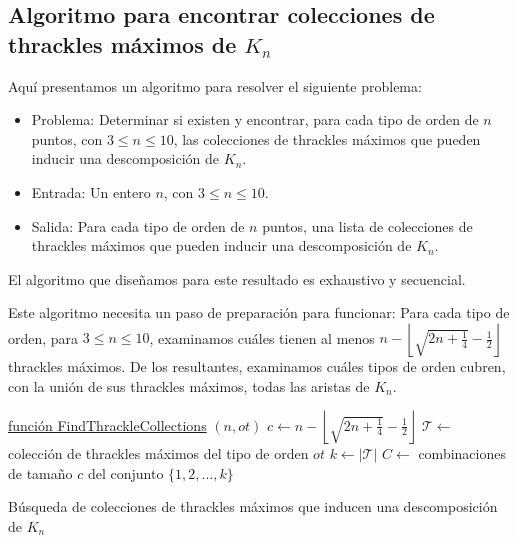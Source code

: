 \subsection{Algoritmo para encontrar colecciones de thrackles máximos de $K_n$} \label{secc:algo_descomposicion_thrackles_maximos}
  Aquí presentamos un algoritmo para resolver el siguiente problema:
  \begin{itemize}
    \item[] Problema: Determinar si existen y encontrar, para cada tipo de orden de $n$ puntos, con $3 \leq n \leq 10$, las colecciones de thrackles máximos que pueden inducir una descomposición de $K_n$.
    \item[] Entrada: Un entero $n$, con $ 3 \leq n \leq 10$.
    \item[] Salida: Para cada tipo de orden de $n$ puntos, una lista de colecciones de thrackles máximos que pueden inducir una descomposición de $K_n$.
  \end{itemize}

  El algoritmo que diseñamos para este resultado es exhaustivo y secuencial.

  Este algoritmo necesita un paso de preparación para funcionar: Para cada tipo de orden,
  para $3\leq n \leq 10$, examinamos cuáles tienen al menos $n - \left\lfloor\sqrt{2n +
  \frac{1}{4}} - \frac{1}{2}\right\rfloor$ thrackles máximos. De los resultantes,
  examinamos cuáles tipos de orden cubren, con la unión de sus thrackles máximos, todas
  las aristas de $K_n$.

  \begin{algorithm}[H]
    \DontPrintSemicolon
    \underline{función FindThrackleCollections} $(n,ot)$\;
    $c \gets n - \left\lfloor\sqrt{2n + \frac{1}{4}} - \frac{1}{2}\right\rfloor$\;
    $\mathcal{T} \gets $ colección de thrackles máximos del tipo de orden $ot$\;
    $k \gets |\mathcal{T}|$\;
    $C \gets $ combinaciones de tamaño $c$ del conjunto $\{1,2,\dots,k\}$\;
    \caption{Búsqueda de colecciones de thrackles máximos que inducen una descomposición
    de $K_n$}
    \label{algo:descomposicion_thrackles_maximos}
  \end{algorithm}

